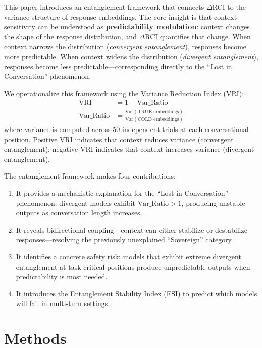 \documentclass[twoside,11pt]{article}
\begin{document}
This paper introduces an entanglement framework that connects $\Delta$RCI to the variance structure of response embeddings. The core insight is that context sensitivity can be understood as \textbf{predictability modulation}: context changes the shape of the response distribution, and $\Delta$RCI quantifies that change. When context narrows the distribution (\emph{convergent entanglement}), responses become more predictable. When context widens the distribution (\emph{divergent entanglement}), responses become less predictable---corresponding directly to the ``Lost in Conversation'' phenomenon.

We operationalize this framework using the Variance Reduction Index (VRI):
\begin{align}
    \text{VRI} &= 1 - \text{Var\_Ratio} \label{eq:vri}\\
    \text{Var\_Ratio} &= \frac{\text{Var}(\text{TRUE embeddings})}{\text{Var}(\text{COLD embeddings})} \label{eq:varratio}
\end{align}
where variance is computed across 50 independent trials at each conversational position. Positive VRI indicates that context reduces variance (convergent entanglement); negative VRI indicates that context increases variance (divergent entanglement).

The entanglement framework makes four contributions:
\begin{enumerate}
    \item It provides a mechanistic explanation for the ``Lost in Conversation'' phenomenon: divergent models exhibit $\text{Var\_Ratio} > 1$, producing unstable outputs as conversation length increases.
    \item It reveals bidirectional coupling---context can either stabilize or destabilize responses---resolving the previously unexplained ``Sovereign'' category.
    \item It identifies a concrete safety risk: models that exhibit extreme divergent entanglement at task-critical positions produce unpredictable outputs when predictability is most needed.
    \item It introduces the Entanglement Stability Index (ESI) to predict which models will fail in multi-turn settings.
\end{enumerate}

\section{Methods}
\end{document}
